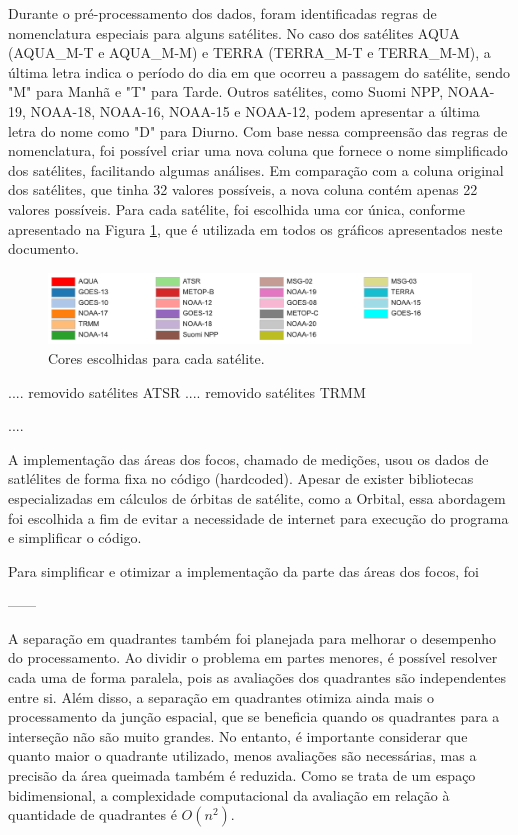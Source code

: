 \documentclass[cic,tc]{iiufrgs}
\begin{document}
Durante o pré-processamento dos dados, foram identificadas regras de nomenclatura especiais para alguns satélites. No caso dos satélites AQUA (AQUA\_M-T e AQUA\_M-M) e TERRA (TERRA\_M-T e TERRA\_M-M), a última letra indica o período do dia em que ocorreu a passagem do satélite, sendo "M" para Manhã e "T" para Tarde. Outros satélites, como Suomi NPP, NOAA-19, NOAA-18, NOAA-16, NOAA-15 e NOAA-12, podem apresentar a última letra do nome como "D" para Diurno. Com base nessa compreensão das regras de nomenclatura, foi possível criar uma nova coluna que fornece o nome simplificado dos satélites, facilitando algumas análises. Em comparação com a coluna original dos satélites, que tinha 32 valores possíveis, a nova coluna contém apenas 22 valores possíveis. Para cada satélite, foi escolhida uma cor única, conforme apresentado na Figura \ref{fig:cores_satelites}, que é utilizada em todos os gráficos apresentados neste documento. \par

\begin{figure}[H]
    \caption{Cores escolhidas para cada satélite.}
    \begin{center}
        \includegraphics[width=35em]{cores_satelites}
    \end{center}
    \label{fig:cores_satelites}
\end{figure}


.... removido satélites ATSR .... removido satélites TRMM



....

A implementação das áreas dos focos, chamado de medições, usou os dados de satlélites de forma fixa no código (hardcoded). Apesar de exister bibliotecas especializadas em cálculos de órbitas de satélite, como a Orbital, essa abordagem foi escolhida a fim de evitar a necessidade de internet para execução do programa e simplificar o código. \par

Para simplificar e otimizar a implementação da parte das áreas dos focos, foi\par

------

A separação em quadrantes também foi planejada para melhorar o desempenho do processamento. Ao dividir o problema em partes menores, é possível resolver cada uma de forma paralela, pois as avaliações dos quadrantes são independentes entre si. Além disso, a separação em quadrantes otimiza ainda mais o processamento da junção espacial, que se beneficia quando os quadrantes para a interseção não são muito grandes. No entanto, é importante considerar que quanto maior o quadrante utilizado, menos avaliações são necessárias, mas a precisão da área queimada também é reduzida. Como se trata de um espaço bidimensional, a complexidade computacional da avaliação em relação à quantidade de quadrantes é $O(n^2)$. \par
\end{document}
